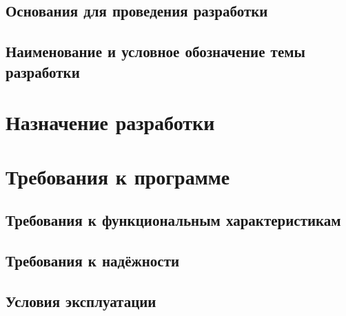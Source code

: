 \documentclass{bmstu-gost-7-32}
\begin{document}
\subsection*{Основания для проведения разработки}

\subsection*{Наименование и условное обозначение темы разработки}

\section{Назначение разработки}


\section{Требования к программе} %

\subsection{Требования к функциональным характеристикам}


\subsection{Требования к надёжности}


\subsection{Условия эксплуатации}

\end{document}
